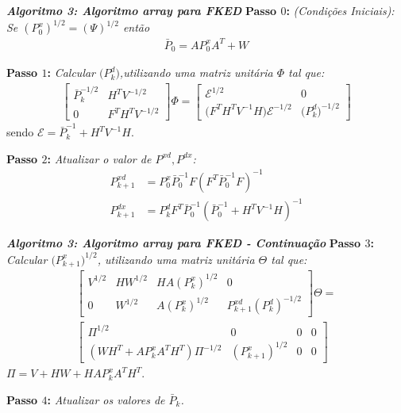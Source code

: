 \begin{frame}
	\hline
	\small \emph{\textbf{Algoritmo 3: Algoritmo \textit{array }para FKED}}
	\hline
	\small \textbf{Passo $0$:} \textit{(Condições Iniciais): Se $(P^{x}_{0})^{1/2} = (\Psi)^{1/2}$ então}
	\small
	\begin{align*}
		\bar{P}_{0} = AP^{x}_{0}A^{T} + W		
	\end{align*}
	
	\small \textbf{Passo $1$:} \textit{Calcular $\big( P^{d}_{k} \big)$,utilizando uma matriz unitária $\Phi$ tal que:}
	\small
	\begin{align}
		\begin{bmatrix}
			\bar{P}_{k}^{-1/2} & H^{T}V^{-1/2}
			\\
			0 & F^{T}H^{T}V^{-1/2}
		\end{bmatrix}\Phi
		=
		\begin{bmatrix}
			\mathcal{E}^{1/2} & 0
			\\
			\big( F^{T}H^{T}V^{-1}H \big) \mathcal{E}^{-1/2} & \big( P^{d}_{k}\big)^{-1/2}
		\end{bmatrix}
	\end{align}
	\small sendo $\mathcal{E} = \bar P_{k}^{ - 1} + {H^T}{V^{ - 1}}H$.
	
	\small \textbf{Passo $2$:} \textit{ Atualizar o valor de $P^{xd}, P^{dx}$:}
	\small
	\begin{align}
		P^{xd}_{k+1} &= P^{x}_{0} \bar{P}^{-1}_{0} F (F^{T} \bar{P}^{-1}_{0} F)^{-1} \nonumber\\
		P^{dx}_{k+1} &= P^{d}_{k} F^{T} \bar{P}^{-1}_{0} (\bar{P}^{-1}_{0} + H^{T} V^{-1} H)^{-1}
	\end{align}
	\hline
\end{frame}

\begin{frame}
	\hline
	\small \emph{\textbf{Algoritmo 3: Algoritmo \textit{array }para FKED - Continuação}}
	\hline
	\small \textbf{Passo $3$:} \textit{Calcular $\big(P^{x}_{k+1}\big)^{1/2}$, utilizando uma matriz unitária $\Theta$ tal que:}
	\small
	\begin{align}
		\begin{bmatrix}
			V^{1/2} & H W^{1/2} & H A \left( P_{k}^{x} \right)^{1/2} & 0
			\\ 
			0 & W^{1/2} & A \left( P_{k}^{x} \right)^{1/2} & P_{k+1}^{xd} (P_{k}^{d})^{-1/2}
		\end{bmatrix} \Theta
		=\nonumber \\
		\begin{bmatrix}
			\Pi^{1/2} & 0 & 0 & 0
			\\
			\left( W H^{T} + A P_{k}^{x} A^{T} H^{T} \right) \Pi^{-1/2} & \left( P^{x}_{k+1} \right)^{1/2} & 0 & 0
		\end{bmatrix}
	\end{align}
	\smallsendo $ \Pi = V + H W + H A P_{k}^{x} A^{T} H^{T}$.
	
	\small \textbf{Passo $4$:} \textit{Atualizar os valores de $\bar{P}_{k}$.}
	\hline
\end{frame}

